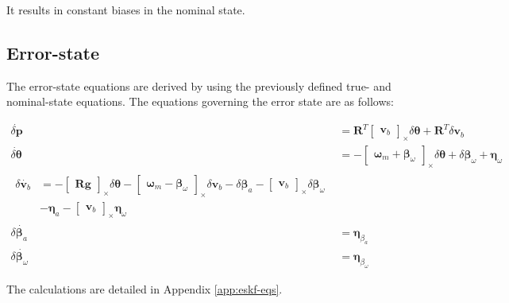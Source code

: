 It results in constant biases in the nominal state.

\subsection*{Error-state}

The error-state equations are derived by using the previously defined true- and nominal-state equations. The equations governing the error state are as follows:

\begin{subequations}
\begin{align}
    \dot{\delta \mathbf{p}}&=\mathbf{R}^T \begin{bmatrix}\mathbf{v}_b\end{bmatrix}_\times\delta\boldsymbol{\theta} + \mathbf{R}^T\delta \mathbf{v}_b \\
    \dot{\delta\boldsymbol{\theta}} &=-\begin{bmatrix}\boldsymbol{\omega}_m + \boldsymbol{\beta}_\omega\end{bmatrix}_\times\delta\boldsymbol{\theta} + \delta\boldsymbol{\beta}_\omega + \boldsymbol{\eta}_{\omega} \\
    \begin{split}
    \delta \dot{\mathbf{v}_b}&=-\begin{bmatrix}\mathbf{R}\mathbf{g}\end{bmatrix}_\times\delta\boldsymbol{\theta} -\begin{bmatrix}\boldsymbol{\omega}_m-\boldsymbol{\beta}_\omega\end{bmatrix}_\times\delta \mathbf{v}_b 
    -\delta\boldsymbol{\beta}_a-\begin{bmatrix}\mathbf{v}_b \end{bmatrix}_\times\delta\boldsymbol{\beta}_\omega \\ &
    -\boldsymbol{\eta}_{a}-\begin{bmatrix}\mathbf{v}_b \end{bmatrix}_\times\boldsymbol{\eta}_{\omega}
    \end{split} \\
    \delta\dot{\boldsymbol{\beta}_a}&=\boldsymbol{\eta}_{\beta_a} \\
    \delta\dot{\boldsymbol{\beta}_\omega}&=\boldsymbol{\eta}_{\beta_\omega}
\end{align}
\label{eq:error-state}
\end{subequations}

The calculations are detailed in Appendix \ref{app:eskf-eqs}.

